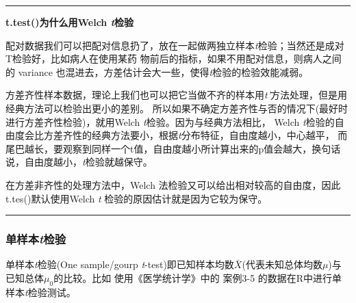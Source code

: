 \documentclass[
]{article}
\begin{document}
\begin{center}\rule{0.5\linewidth}{0.5pt}\end{center}

\textbf{t.test()为什么用Welch \emph{t}检验}

配对数据我们可以把配对信息扔了，放在一起做两独立样本\emph{t}检验；当然还是成对T检验好，比如病人在使用某药
物前后的指标，如果不用配对信息，则病人之间的 variance 也混进去，方差估计会大一些，使得\emph{t}检验的检验效能减弱。

方差齐性样本数据，理论上我们也可以把它当做不齐的样本用\emph{t'}方法处理，但是用经典方法可以检验出更小的差别。
所以如果不确定方差齐性与否的情况下(最好时进行方差齐性检验)，就用Welch \emph{t}检验。因为与经典方法相比，
Welch \emph{t}检验的自由度会比方差齐性的经典方法要小，根据\emph{t}分布特征，自由度越小，中心越平，
而尾巴越长，要观察到同样一个t值，自由度越小所计算出来的p值会越大，换句话说，自由度越小，\emph{t}检验就越保守。

在方差非齐性的处理方法中，Welch 法检验又可以给出相对较高的自由度，因此t.tes()默认使用Welch \emph{t} 检验的原因估计就是因为它较为保守。

\begin{center}\rule{0.5\linewidth}{0.5pt}\end{center}

\hypertarget{ux5355ux6837ux672ctux68c0ux9a8c}{%
\subsubsection{\texorpdfstring{单样本\emph{t}检验}{单样本t检验}}\label{ux5355ux6837ux672ctux68c0ux9a8c}}

单样本\emph{t}检验(One sample/gourp \emph{t}-test)即已知样本均数\(\bar{X}\)(代表未知总体均数\(μ\))与已知总体\(μ_0\)的比较。比如
使用《医学统计学》中的 案例3-5 的数据在R中进行单样本\emph{t}检验测试。
\end{document}
